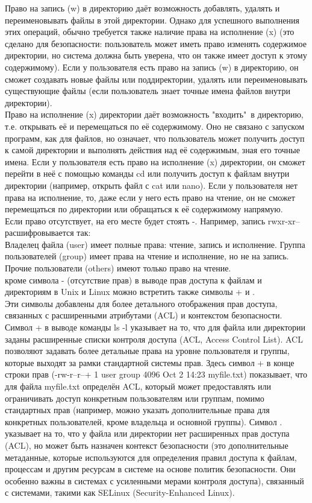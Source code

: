 Право на запись (w) в директорию даёт возможность добавлять, удалять и переименовывать файлы в этой директории. Однако для успешного выполнения этих операций, обычно требуется также наличие права на исполнение (x) (это сделано для безопасности: пользователь может иметь право изменять содержимое директории, но система должна быть уверена, что он также имеет доступ к этому содержимому). Если у пользователя есть право на запись (w) в директорию, он сможет создавать новые файлы или поддиректории, удалять или переименовывать существующие файлы (если пользователь знает точные имена файлов внутри директории). \\
Право на исполнение (x) директории даёт возможность "входить"\ в директорию, т.е. открывать её и перемещаться по её содержимому. Оно не связано с запуском программ, как для файлов, но означает, что пользователь может получить доступ к самой директории и выполнять действия над её содержимым, зная его точные имена. Если у пользователя есть право на исполнение (x) директории, он сможет перейти в неё с помощью команды cd или получить доступ к файлам внутри директории (например, открыть файл с cat или nano). Если у пользователя нет права на исполнение, то, даже если у него есть право на чтение, он не сможет перемещаться по директории или обращаться к её содержимому напрямую. \\
Если право отсутствует, на его месте будет стоять -. Например, запись rwxr-xr-- расшифровывается так: \\
Владелец файла (user) имеет полные права: чтение, запись и исполнение. Группа пользователей (group) имеет права на чтение и исполнение, но не на запись. Прочие пользователи (others) имеют только право на чтение. \\
кроме символа - (отсутствие прав) в выводе прав доступа к файлам и директориям в Unix и Linux можно встретить также символы + и .  \\
Эти символы добавлены для более детального отображения прав доступа, связанных с расширенными атрибутами (ACL) и контекстом безопасности. Символ + в выводе команды ls -l указывает на то, что для файла или директории заданы расширенные списки контроля доступа (ACL, Access Control List). ACL позволяют задавать более детальные права на уровне пользователя и группы, которые выходят за рамки стандартной системы прав. Здесь символ + в конце строки прав (-rw-r--r--+ 1 user group  4096 Oct  2 14:23 myfile.txt) показывает, что для файла myfile.txt определён ACL, который может предоставлять или ограничивать доступ конкретным пользователям или группам, помимо стандартных прав (например, можно указать дополнительные права для конкретных пользователей, кроме владельца и основной группы). Символ . указывает на то, что у файла или директории нет расширенных прав доступа (ACL), но может быть назначен контекст безопасности (это дополнительные метаданные, которые используются для определения правил доступа к файлам, процессам и другим ресурсам в системе на основе политик безопасности. Они особенно важны в системах с усиленными мерами контроля доступа), связанный с системами, такими как SELinux (Security-Enhanced Linux). \\

